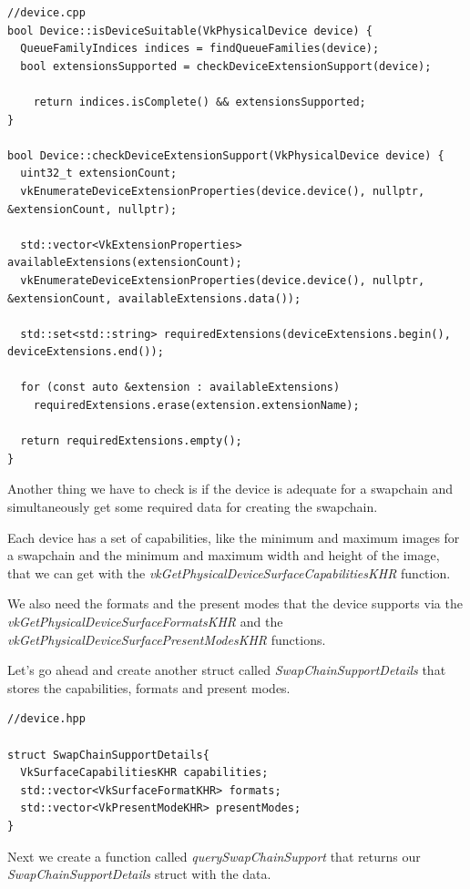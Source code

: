 \documentclass[12pt]{report} \usepackage{preamble}
\begin{document}
\begin{lstlisting}[Language=C++]
//device.cpp
bool Device::isDeviceSuitable(VkPhysicalDevice device) {
  QueueFamilyIndices indices = findQueueFamilies(device);
  bool extensionsSupported = checkDeviceExtensionSupport(device);

	return indices.isComplete() && extensionsSupported;
}

bool Device::checkDeviceExtensionSupport(VkPhysicalDevice device) {
  uint32_t extensionCount;
  vkEnumerateDeviceExtensionProperties(device.device(), nullptr, &extensionCount, nullptr);

  std::vector<VkExtensionProperties> availableExtensions(extensionCount);
  vkEnumerateDeviceExtensionProperties(device.device(), nullptr, &extensionCount, availableExtensions.data());

  std::set<std::string> requiredExtensions(deviceExtensions.begin(), deviceExtensions.end());

  for (const auto &extension : availableExtensions)
    requiredExtensions.erase(extension.extensionName);

  return requiredExtensions.empty();
}
\end{lstlisting}

Another thing we have to check is if the device is adequate for a swapchain and simultaneously
get some required data for creating the swapchain.

Each device has a set of capabilities, like the minimum and maximum images for a swapchain
and the minimum and maximum width and height of the image, that we can get with the
\textit{vkGetPhysicalDeviceSurfaceCapabilitiesKHR} function.

We also need the formats and the present modes that the device supports via the \\
\textit{vkGetPhysicalDeviceSurfaceFormatsKHR} and the \textit{vkGetPhysicalDeviceSurfacePresentModesKHR}
functions.

Let's go ahead and create another struct called \textit{SwapChainSupportDetails} that stores the capabilities,
formats and present modes.

\begin{lstlisting}[Language=C++]
//device.hpp

struct SwapChainSupportDetails{
  VkSurfaceCapabilitiesKHR capabilities;
  std::vector<VkSurfaceFormatKHR> formats;
  std::vector<VkPresentModeKHR> presentModes;
}
\end{lstlisting}

Next we create a function called \textit{querySwapChainSupport} that returns our
\textit{SwapChainSupportDetails} struct with the data.
\end{document}
